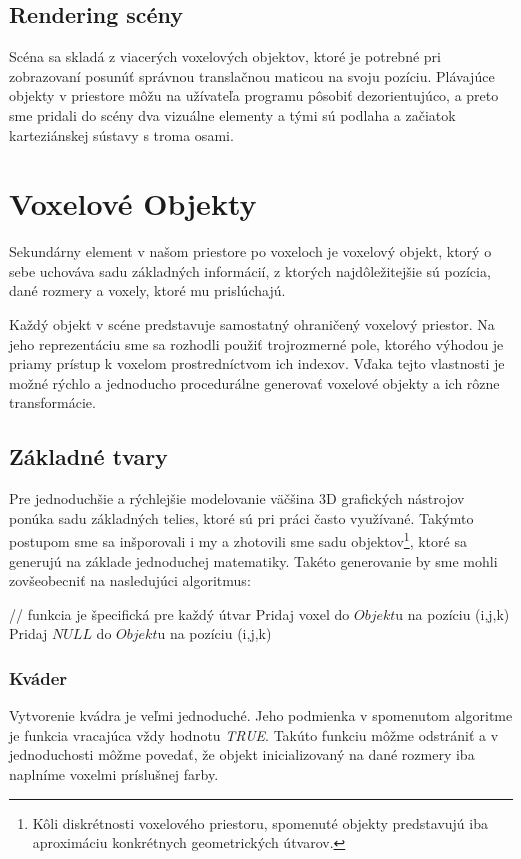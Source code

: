 \subsection{Rendering scény}
Scéna sa skladá z viacerých voxelových objektov, ktoré je potrebné pri zobrazovaní posunúť správnou translačnou maticou na svoju pozíciu. Plávajúce objekty v priestore môžu na užívateľa programu pôsobiť dezorientujúco, a preto sme pridali do scény dva vizuálne elementy a tými sú podlaha a začiatok karteziánskej sústavy s troma osami. 


\section{Voxelové Objekty}\label{voxelObjects}
Sekundárny element v našom priestore po voxeloch je voxelový objekt, ktorý o sebe uchováva sadu základných informácií, z ktorých najdôležitejšie sú pozícia, dané rozmery a voxely, ktoré mu prislúchajú.

Každý objekt v scéne predstavuje samostatný ohraničený voxelový priestor. Na jeho reprezentáciu sme sa rozhodli použiť trojrozmerné pole, ktorého výhodou je priamy prístup k voxelom prostredníctvom ich indexov.
Vďaka tejto vlastnosti je možné rýchlo a jednoducho procedurálne generovať voxelové objekty a ich rôzne transformácie.

\subsection{Základné tvary}
Pre jednoduchšie a rýchlejšie modelovanie väčšina 3D grafických nástrojov ponúka sadu základných telies, ktoré sú pri práci často využívané. Takýmto postupom sme sa inšporovali i my a zhotovili sme sadu objektov\footnote{Kôli diskrétnosti voxelového priestoru, spomenuté objekty predstavujú iba aproximáciu konkrétnych geometrických útvarov.}, ktoré sa generujú na základe jednoduchej matematiky. Takéto generovanie by sme mohli zovšeobecniť na nasledujúci algoritmus:


\begin{algorithmic}
		 // funkcia je špecifická pre každý útvar
			\State Pridaj voxel do $Objekt$u na pozíciu (i,j,k)
		\Else
			\State Pridaj $NULL$ do $Objekt$u na pozíciu (i,j,k)
		\EndIf
	\EndFor
\end{algorithmic} 

	\subsubsection{Kváder}
	Vytvorenie kvádra je veľmi jednoduché. Jeho podmienka v spomenutom algoritme je funkcia vracajúca vždy hodnotu \textit{TRUE}. Takúto funkciu môžme odstrániť a v jednoduchosti môžme povedať, že objekt inicializovaný na dané rozmery iba naplníme voxelmi príslušnej farby.
